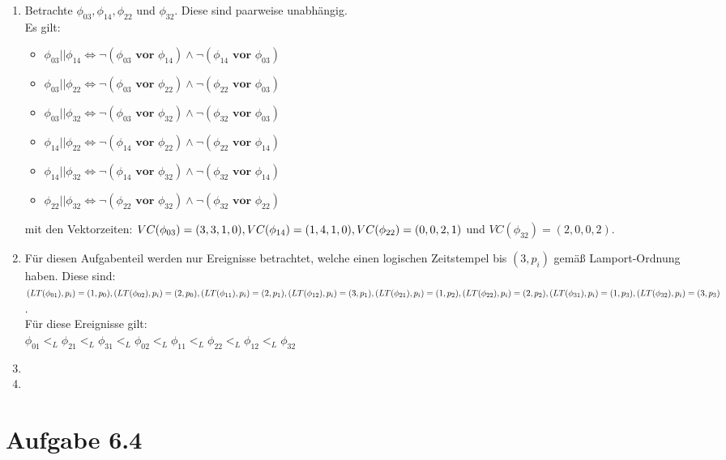 \documentclass[12pt, paper=a4]{article}
\begin{document}
\begin{enumerate}
	\item Betrachte \(\phi_{03}, \phi_{14}, \phi_{22}\) und \(\phi_{32}\). Diese sind paarweise unabh\"angig.\\
	Es gilt:
		\begin{itemize}
			\item \(\phi_{03} || \phi_{14} \Leftrightarrow \lnot (\phi_{03} \textbf{ vor } \phi_{14}) \land  
			\lnot (\phi_{14} \textbf{ vor } \phi_{03})\)
			\item \(\phi_{03} || \phi_{22} \Leftrightarrow \lnot (\phi_{03} \textbf{ vor } \phi_{22}) \land  
			\lnot (\phi_{22} \textbf{ vor } \phi_{03})\)
			\item \(\phi_{03} || \phi_{32} \Leftrightarrow \lnot (\phi_{03} \textbf{ vor } \phi_{32}) \land  
			\lnot (\phi_{32} \textbf{ vor } \phi_{03})\)
			\item \(\phi_{14} || \phi_{22} \Leftrightarrow \lnot (\phi_{14} \textbf{ vor } \phi_{22}) \land  
			\lnot (\phi_{22} \textbf{ vor } \phi_{14})\)
			\item \(\phi_{14} || \phi_{32} \Leftrightarrow \lnot (\phi_{14} \textbf{ vor } \phi_{32}) \land  
			\lnot (\phi_{32} \textbf{ vor } \phi_{14})\)
			\item \(\phi_{22} || \phi_{32} \Leftrightarrow \lnot (\phi_{22} \textbf{ vor } \phi_{32}) \land  
			\lnot (\phi_{32} \textbf{ vor } \phi_{22})\)
		\end{itemize}
	mit den Vektorzeiten: \(VC(\phi_{03})=(3,3,1,0), VC(\phi_{14})=(1,4,1,0),\\
	VC(\phi_{22})=(0,0,2,1)\) und \(VC(\phi_{32})=(2,0,0,2)\).
	
	\item F\"ur diesen Aufgabenteil werden nur Ereignisse betrachtet, welche einen logischen Zeitstempel bis \((3,p_i)\)
	gem\"a{\ss} Lamport-Ordnung haben. Diese sind:\\
	\((LT(\phi_{01}),p_i)=(1,p_0), (LT(\phi_{02}),p_i)=(2,p_0),\\
	(LT(\phi_{11}),p_i)=(2,p_1), (LT(\phi_{12}),p_i)=(3,p_1),\\
	(LT(\phi_{21}),p_i)=(1,p_2), (LT(\phi_{22}),p_i)=(2,p_2),\\
	(LT(\phi_{31}),p_i)=(1,p_3), (LT(\phi_{32}),p_i)=(3,p_3)\).\\
	F\"ur diese Ereignisse gilt:\\
	\(\phi_{01} <_L \phi_{21} <_L \phi_{31} <_L \phi_{02} <_L \phi_{11} <_L \phi_{22} <_L \phi_{12} <_L \phi_{32} \)
	
	\item
	
	\item
\end{enumerate}

\section*{Aufgabe 6.4}
\end{document}
